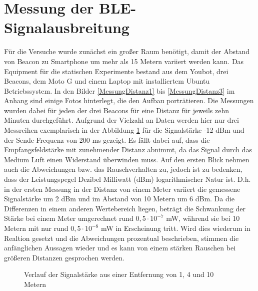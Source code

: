 \section{Messung der BLE-Signalausbreitung}\label{sec:MessungBLE}
Für die Versuche wurde zunächst ein großer Raum benötigt, damit der Abstand von Beacon zu Smartphone um mehr als 15 Metern variiert werden kann. Das Equipment für die statischen Experimente bestand aus dem Youbot, drei Beacons, dem Moto G und einem Laptop mit installiertem Ubuntu Betriebssystem. In den Bilder \ref{MessungDistanz1} bis \ref{MessungDistanz3} im Anhang sind einige Fotos hinterlegt, die den Aufbau porträtieren. Die Messungen wurden dabei für jeden der drei Beacons für eine Distanz für jeweils zehn Minuten durchgeführt. Aufgrund der Vielzahl an Daten werden hier nur drei Messreihen exemplarisch in der Abbildung \ref{fig:MeterNormal} für die Signalstärke -12 dBm und der Sende-Frequenz von 200 ms gezeigt. Es fällt dabei auf, dass die Empfangsfeldstärke mit zunehmender Distanz abnimmt, da das Signal durch das Medium Luft einen Widerstand überwinden muss. Auf den ersten Blick nehmen auch die Abweichungen bzw. das Rauschverhalten zu, jedoch ist zu bedenken, dass der Leistungspegel Dezibel Milliwatt (dBm) logarithmischer Natur ist. D.h. in der ersten Messung in der Distanz von einem Meter variiert die gemessene Signalstärke um 2 dBm und im Abstand von 10 Metern um 6 dBm. Da die Differenzen in einem anderen Wertebereich liegen, beträgt die Schwankung der Stärke bei einem Meter umgerechnet rund $0,5 \cdot 10^{-7}$ mW, während sie bei 10 Metern mit nur rund $0,5 \cdot 10^{-8}$ mW in Erscheinung tritt. Wird dies wiederum in Realtion gesetzt und die Abweichungen prozentual beschrieben, stimmen die anfänglichen Aussagen wieder und es kann von einem stärken Rauschen bei größeren Distanzen gesprochen werden.
\begin{figure}[H] 
\centering
{}
\caption{Verlauf der Signalstärke aus einer Entfernung von 1, 4 und 10 Metern}
\label{fig:MeterNormal}
\end{figure}
